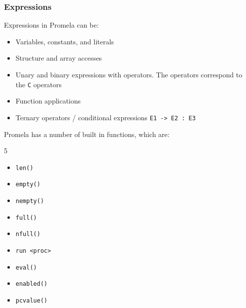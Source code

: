 \subsubsection{Expressions}
Expressions in Promela can be:
\begin{itemize}
    \item Variables, constants, and literals
    \item Structure and array accesses
    \item Unary and binary expressions with operators. The operators correspond to the \texttt{C} operators
    \item Function applications
    \item Ternary operators / conditional expressions \texttt{E1 -> E2 : E3}
\end{itemize}
Promela has a number of built in functions, which are:
\begin{multicols}{5}
    \begin{itemize}
        \item \texttt{len()}
        \item \texttt{empty()}
        \item \texttt{nempty()}
        \item \texttt{full()}
        \item \texttt{nfull()}
        \item \texttt{run <proc>}
        \item \texttt{eval()}
        \item \texttt{enabled()}
        \item \texttt{pcvalue()}
    \end{itemize}
\end{multicols}
